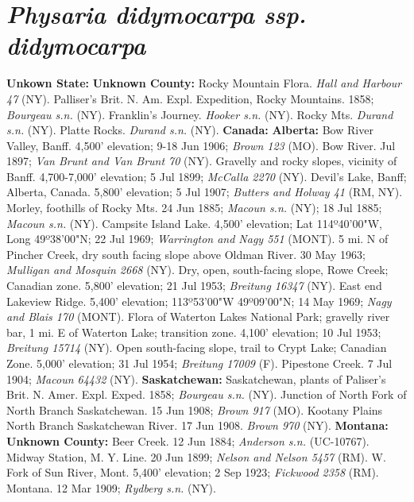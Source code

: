 \section*{\textit{Physaria didymocarpa ssp. didymocarpa}}

  \textbf{Unkown State:}
  \textbf{Unknown County:}
Rocky Mountain Flora. \textit{Hall and Harbour 47} (NY).
Palliser's Brit. N. Am. Expl. Expedition, Rocky Mountains. 1858;
\textit{Bourgeau s.n.} (NY).
Franklin's Journey. \textit{Hooker s.n.} (NY).
Rocky Mts. \textit{Durand s.n.} (NY).
Platte Rocks. \textit{Durand s.n.} (NY).
  \textbf{Canada:}
  \textbf{Alberta:}
Bow River Valley, Banff. 4,500' elevation; 9-18 Jun 1906;
\textit{Brown 123} (MO).
Bow River. Jul 1897; \textit{Van Brunt and Van Brunt 70} (NY).
Gravelly and rocky slopes, vicinity of Banff. 4,700-7,000' elevation;
5 Jul 1899; \textit{McCalla 2270} (NY).
Devil's Lake, Banff; Alberta, Canada. 5,800' elevation; 5 Jul 1907;
\textit{Butters and Holway 41} (RM, NY).
Morley, foothills of Rocky Mts. 24 Jun 1885; \textit{Macoun s.n.} (NY);
18 Jul 1885; \textit{Macoun s.n.} (NY).
Campsite Island Lake. 4,500' elevation; Lat 114º40'00"W, Long 49º38'00"N;
22 Jul 1969; \textit{Warrington and Nagy 551} (MONT).
5 mi. N of Pincher Creek, dry south facing slope above Oldman River.
30 May 1963; \textit{Mulligan and Mosquin 2668} (NY).
Dry, open, south-facing slope, Rowe Creek; Canadian zone. 5,800' elevation;
21 Jul 1953; \textit{Breitung 16347} (NY).
East end Lakeview Ridge. 5,400' elevation; 113º53'00"W 49º09'00"N; 14 May 1969;
\textit{Nagy and Blais 170} (MONT).
Flora of Waterton Lakes National Park; gravelly river bar, 1 mi. E of Waterton
Lake; transition zone. 4,100' elevation; 10 Jul 1953;
\textit{Breitung 15714} (NY).
Open south-facing slope, trail to Crypt Lake; Canadian Zone. 5,000' elevation;
31 Jul 1954; \textit{Breitung 17009} (F).
Pipestone Creek. 7 Jul 1904; \textit{Macoun 64432} (NY).
  \textbf{Saskatchewan:}
Saskatchewan, plants of Paliser's Brit. N. Amer. Expl. Exped. 1858;
\textit{Bourgeau s.n.} (NY).
Junction of North Fork of North Branch Saskatchewan. 15 Jun 1908;
\textit{Brown 917} (MO).
Kootany Plains North Branch Saskatchewan River. 17 Jun 1908.
\textit{Brown 970} (NY).
  \textbf{Montana:}
  \textbf{Unknown County:}
Beer Creek. 12 Jun 1884; \textit{Anderson s.n.} (UC-10767).
Midway Station, M. Y. Line. 20 Jun 1899; \textit{Nelson and Nelson 5457} (RM).
W. Fork of Sun River, Mont. 5,400' elevation; 2 Sep 1923;
\textit{Fickwood 2358} (RM).
Montana. 12 Mar 1909; \textit{Rydberg s.n.} (NY).
